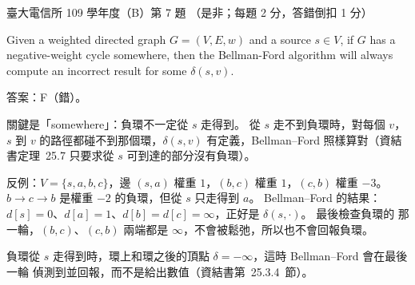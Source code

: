 \begin{pastexam}[label={px:ntu-109-comm-dsa-07}]{臺大電信所 109 學年度（B）第 7 題}
（是非；每題 2 分，答錯倒扣 1 分）

Given a weighted directed graph $G=(V,E,w)$ and a source $s\in V$, if $G$ has a negative-weight
cycle somewhere, then the Bellman-Ford algorithm will always compute an incorrect result for some
$\delta(s,v)$.
\end{pastexam}

\begin{pastsoln}
答案：F（錯）。

關鍵是「somewhere」：負環不一定從 $s$ 走得到。 從 $s$ 走不到負環時，對每個 $v$，$s$ 到
$v$ 的路徑都碰不到那個環，$\delta(s, v)$ 有定義，Bellman--Ford 照樣算對（資結書定理~25.7
只要求從 $s$ 可到達的部分沒有負環）。

反例：$V = \{s, a, b, c\}$，邊 $(s, a)$ 權重 $1$，$(b, c)$ 權重 $1$，$(c, b)$ 權重 $-3$。
$b \to c \to b$ 是權重 $-2$ 的負環，但從 $s$ 只走得到 $a$。 Bellman--Ford 的結果：
$d[s] = 0$、$d[a] = 1$、$d[b] = d[c] = \infty$，正好是 $\delta(s, \cdot)$。 最後檢查負環的
那一輪，$(b, c)$、$(c, b)$ 兩端都是 $\infty$，不會被鬆弛，所以也不會回報負環。

負環從 $s$ 走得到時，環上和環之後的頂點 $\delta = -\infty$，這時 Bellman--Ford 會在最後一輪
偵測到並回報，而不是給出數值（資結書第~25.3.4~節）。
\end{pastsoln}

